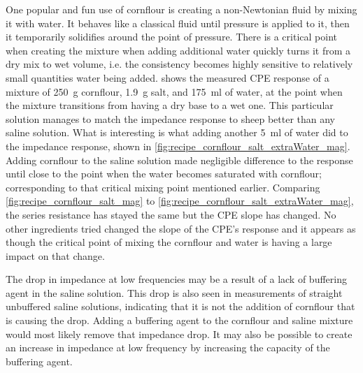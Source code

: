   One popular and fun use of cornflour is creating a non-Newtonian fluid by mixing it with water.
  It behaves like a classical fluid until pressure is applied to it, then it temporarily solidifies around the point of pressure.
  There is a critical point when creating the mixture when adding additional water quickly turns it from a dry mix to wet volume, i.e. the consistency becomes highly sensitive to relatively small quantities water being added.
   shows the measured CPE response of a mixture of \SI{250}{\gram} cornflour, \SI{1.9}{\gram} salt, and \SI{175}{\milli\litre} of water, at the point when the mixture transitions from having a dry base to a wet one.
  This particular solution manages to match the impedance response to sheep better than any saline solution.
  What is interesting is what adding another \SI{5}{\milli\litre} of water did to the impedance response, shown in \cref{fig:recipe_cornflour_salt_extraWater_mag}.
  Adding cornflour to the saline solution made negligible difference to the response until close to the point when the water becomes saturated with cornflour; corresponding to that critical mixing point mentioned earlier.
  Comparing \cref{fig:recipe_cornflour_salt_mag} to \cref{fig:recipe_cornflour_salt_extraWater_mag}, the series resistance has stayed the same but the CPE slope has changed.
  No other ingredients tried changed the slope of the CPE's response and it appears as though the critical point of mixing the cornflour and water is having a large impact on that change.

  The drop in impedance at low frequencies may be a result of a lack of buffering agent in the saline solution.
  This drop is also seen in measurements of straight unbuffered saline solutions, indicating that it is not the addition of cornflour that is causing the drop.
  Adding a buffering agent to the cornflour and saline mixture would most likely remove that impedance drop.
  It may also be possible to create an increase in impedance at low frequency by increasing the capacity of the buffering agent.

